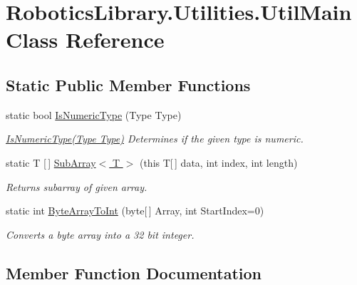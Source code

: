 \hypertarget{class_robotics_library_1_1_utilities_1_1_util_main}{}\section{Robotics\+Library.\+Utilities.\+Util\+Main Class Reference}
\label{class_robotics_library_1_1_utilities_1_1_util_main}
\subsection*{Static Public Member Functions}
\begin{DoxyCompactItemize}
\item 
static bool \hyperlink{class_robotics_library_1_1_utilities_1_1_util_main_ace1cebf392a2b212cd010f7e718dee7d}{Is\+Numeric\+Type} (Type Type)
\begin{DoxyCompactList}\small\item\em {\ttfamily \hyperlink{class_robotics_library_1_1_utilities_1_1_util_main_ace1cebf392a2b212cd010f7e718dee7d}{Is\+Numeric\+Type(\+Type Type)}} Determines if the given type is numeric. \end{DoxyCompactList}\item 
static T \mbox{[}$\,$\mbox{]} \hyperlink{class_robotics_library_1_1_utilities_1_1_util_main_ab6835fcaf2e37cfa3b57b1400e7c91df}{Sub\+Array$<$ T $>$} (this T\mbox{[}$\,$\mbox{]} data, int index, int length)
\begin{DoxyCompactList}\small\item\em Returns subarray of given array. \end{DoxyCompactList}\item 
static int \hyperlink{class_robotics_library_1_1_utilities_1_1_util_main_ae9449018f0029862548f017f4d00de05}{Byte\+Array\+To\+Int} (byte\mbox{[}$\,$\mbox{]} Array, int Start\+Index=0)
\begin{DoxyCompactList}\small\item\em Converts a byte array into a 32 bit integer. \end{DoxyCompactList}\end{DoxyCompactItemize}


\subsection{Member Function Documentation}
\mbox{\label{class_robotics_library_1_1_utilities_1_1_util_main_ae9449018f0029862548f017f4d00de05}} 
